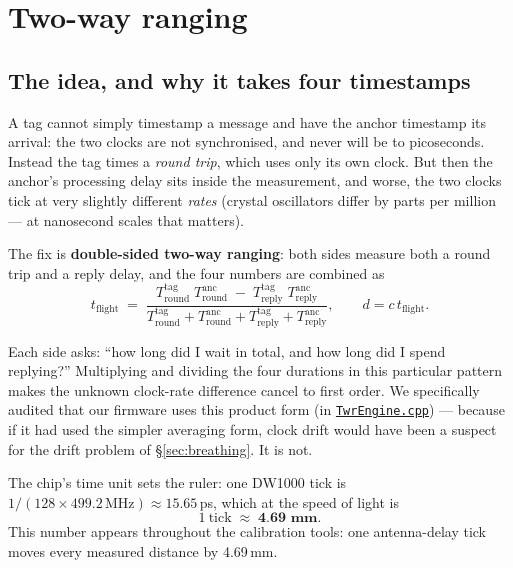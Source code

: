 \documentclass[11pt,a4paper]{article}
\newcommand{\gh}[2]{\href{https://github.com/AdershM-2/UWB_3/blob/main/#1}{\texttt{#2}}}
\begin{document}
\section{Two-way ranging}
\label{sec:twr}

\subsection{The idea, and why it takes four timestamps}

A tag cannot simply timestamp a message and have the anchor timestamp its arrival:
the two clocks are not synchronised, and never will be to picoseconds. Instead the
tag times a \emph{round trip}, which uses only its own clock. But then the anchor's
processing delay sits inside the measurement, and worse, the two clocks tick at
very slightly different \emph{rates} (crystal oscillators differ by parts per
million --- at nanosecond scales that matters).

The fix is \textbf{double-sided two-way ranging}: both sides measure both a round
trip and a reply delay, and the four numbers are combined as
\begin{equation}
\label{eq:dstwr}
t_{\text{flight}} \;=\;
\frac{T^{\text{tag}}_{\text{round}}\; T^{\text{anc}}_{\text{round}}
      \;-\; T^{\text{tag}}_{\text{reply}}\; T^{\text{anc}}_{\text{reply}}}
     {T^{\text{tag}}_{\text{round}} + T^{\text{anc}}_{\text{round}}
      + T^{\text{tag}}_{\text{reply}} + T^{\text{anc}}_{\text{reply}}},
\qquad d = c\, t_{\text{flight}} .
\end{equation}

\begin{plainwords}
Each side asks: ``how long did I wait in total, and how long did I spend replying?''
Multiplying and dividing the four durations in this particular pattern makes the
unknown clock-rate difference cancel to first order. We specifically audited that
our firmware uses this product form (in
\gh{libraries/UwbRtls/src/TwrEngine.cpp}{TwrEngine.cpp}) --- because if it had used
the simpler averaging form, clock drift would have been a suspect for the drift
problem of \S\ref{sec:breathing}. It is not.
\end{plainwords}

The chip's time unit sets the ruler: one DW1000 tick is
$1/(128 \times 499.2\,\text{MHz}) \approx 15.65$\,ps, which at the speed of light is
\begin{equation}
1\ \text{tick} \;\approx\; \textbf{4.69 mm}.
\end{equation}
This number appears throughout the calibration tools: one antenna-delay tick moves
every measured distance by 4.69\,mm.
\end{document}
